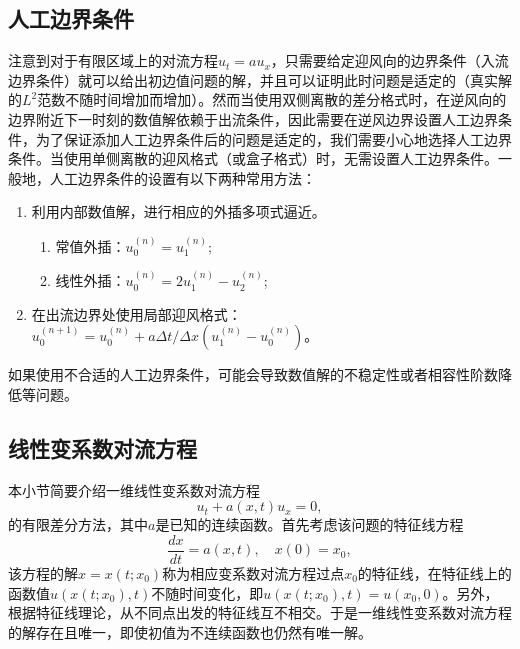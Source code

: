 \documentclass[a4paper,10pt]{ctexart}
\begin{document}
\subsection{人工边界条件}
注意到对于有限区域上的对流方程$ u_t=au_x $，只需要给定迎风向的边界条件（入流边界条件）就可以给出初边值问题的解，并且可以证明此时问题是适定的（真实解的$ L^2 $范数不随时间增加而增加）。然而当使用双侧离散的差分格式时，在逆风向的边界附近下一时刻的数值解依赖于出流条件，因此需要在逆风边界设置人工边界条件，为了保证添加人工边界条件后的问题是适定的，我们需要小心地选择人工边界条件。当使用单侧离散的迎风格式（或盒子格式）时，无需设置人工边界条件。一般地，人工边界条件的设置有以下两种常用方法：
\begin{enumerate}
    \item 利用内部数值解，进行相应的外插多项式逼近。
    \begin{enumerate}
        \item 常值外插：$ u^{(n)}_0 = u^{(n)}_1 $;
        \item 线性外插：$ u^{(n)}_0 = 2u^{(n)}_1 - u^{(n)}_2 $;
    \end{enumerate}
    \item 在出流边界处使用局部迎风格式：$ u^{(n+1)}_0 = u^{(n)}_0 + a\Delta t / \Delta x (u^{(n)}_1 - u^{(n)}_0) $。
\end{enumerate}
如果使用不合适的人工边界条件，可能会导致数值解的不稳定性或者相容性阶数降低等问题。

\subsection{线性变系数对流方程}
本小节简要介绍一维线性变系数对流方程
\begin{equation}
    u_t + a(x,t)u_x = 0,
\end{equation}
的有限差分方法，其中$ a $是已知的连续函数。首先考虑该问题的特征线方程
\[
    \frac{d x}{d t} = a(x,t),\quad x(0) = x_0,
\]
该方程的解$ x=x(t;x_0) $称为相应变系数对流方程过点$ x_0 $的特征线，在特征线上的函数值$ u(x(t;x_0),t) $不随时间变化，即$ u(x(t;x_0),t) = u(x_0,0) $。另外，根据特征线理论，从不同点出发的特征线互不相交。于是一维线性变系数对流方程的解存在且唯一，即使初值为不连续函数也仍然有唯一解。
\end{document}
